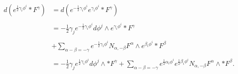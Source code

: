 \begin{equation}
\begin{aligned}
d(e^{\frac{1}{2}\gamma _{i}\phi ^{i}}\ast F^{\gamma })&=d(e
^{-\frac{1}{2}\gamma _{i}\phi ^{i}}e^{\gamma _{i}\phi ^{i}}\ast
F^{\gamma })\\
\\
&=-\frac{1}{2}\gamma _{j}e^{-\frac{1}{2}\gamma _{i}\phi ^{i}}d\phi ^{j}\wedge e
^{\gamma _{i}\phi ^{i}}\ast F^{\gamma }\\
\\
&+\sum\limits_{\alpha -\beta =-\gamma }
e^{-\frac{1}{2}\gamma _{i}\phi ^{i}}N_{\alpha ,-\beta }F^{\alpha
}\wedge e^{\beta _{i}\phi ^{i}}\ast F^{\beta }\\
\\
&=-\frac{1}{2}\gamma _{j}e^{\frac{1}{2}\gamma _{i}\phi ^{i}}d\phi ^{j}\wedge \ast
F^{\gamma }+\sum\limits_{\alpha -\beta =-\gamma }e^{\frac{1}{2}
\alpha _{i}\phi ^{i}}e^{\frac{1}{2}\beta _{i}\phi ^{i}}N_{\alpha
,-\beta }F^{\alpha }\wedge \ast F^{\beta }.
\end{aligned}
\end{equation}

